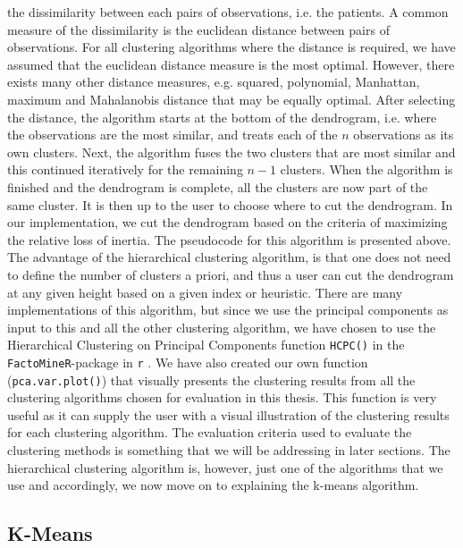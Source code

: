 \documentclass[../thesis.tex]{subfiles}
\begin{document}
\noindent the dissimilarity between each pairs of observations, i.e. the patients. A common measure of the dissimilarity is the euclidean distance between pairs of observations. For all clustering algorithms where the distance is required, we have assumed that the euclidean distance measure is the most optimal. However, there exists many other distance measures, e.g. squared, polynomial, Manhattan, maximum and Mahalanobis distance that may be equally optimal. After selecting the distance, the algorithm starts at the bottom of the dendrogram, i.e. where the observations are the most similar, and treats each of the $n$ observations as its own clusters. Next, the algorithm fuses the two clusters that are most similar and this continued iteratively for the remaining $n - 1$ clusters. When the algorithm is finished and the dendrogram is complete, all the clusters are now part of the same cluster. It is then up to the user to choose where to cut the dendrogram. In our implementation, we cut the dendrogram based on the criteria of maximizing the relative loss of inertia. The pseudocode for this algorithm is presented above.\\
\indent The advantage of the hierarchical clustering algorithm, is that one does not need to define the number of clusters a priori, and thus a user can cut the dendrogram at any given height based on a given index or heuristic. There are many implementations of this algorithm, but since we use the principal components as input to this and all the other clustering algorithm, we have chosen to use the Hierarchical Clustering on Principal Components function \texttt{HCPC()} in the \texttt{FactoMineR}-package in \texttt{r} \citep{FactoMineR}. We have also created our own function (\texttt{pca.var.plot()}) that visually presents the clustering results from all the clustering algorithms chosen for evaluation in this thesis. This function is very useful as it can supply the user with a visual illustration of the clustering results for each clustering algorithm. The evaluation criteria used to evaluate the clustering methods is something that we will be addressing in later sections. The hierarchical clustering algorithm is, however, just one of the algorithms that we use and accordingly, we now move on to explaining the k-means algorithm.

\vspace*{-0,25cm}\subsection{K-Means}
\label{subsec:K-Means}
\end{document}
